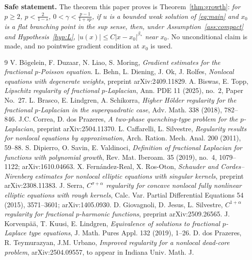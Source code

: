 \documentclass[11pt]{amsart}
\theoremstyle{plain}
\theoremstyle{definition}
\theoremstyle{remark}
\begin{document}
\medskip
\noindent\textbf{Safe statement.} The theorem this paper proves is
Theorem~\ref{thm:growth}: \emph{for $p\ge2$, $p<\frac2{1-s}$,
$0<\gamma<\frac{p-1}{1+sp}$, if $u$ is a bounded weak solution of
\eqref{eq:main} and $x_0$ is a flat branching point in the sup sense, then,
under Assumption~\ref{ass:compact} and Hypothesis~\ref{hyp:L},
$|u(x)|\le C|x-x_0|^{\beta_*}$ near $x_0$.} No unconditional claim is made,
and no pointwise gradient condition at $x_0$ is used.

\begin{thebibliography}{9}
 V. B\"ogelein, F. Duzaar, N. Liao, S. Moring, \emph{Gradient
estimates for the fractional $p$-Poisson equation}. %
 L. Behn, L. Diening, J. Ok, J. Rolfes, \emph{Nonlocal
equations with degenerate weights}, preprint arXiv:2409.11829.
 A. Biswas, E. Topp, \emph{Lipschitz regularity of fractional
$p$-Laplacian}, Ann. PDE 11 (2025), no.~2, Paper No.~27.
 L. Brasco, E. Lindgren, A. Schikorra, \emph{Higher H\"older
regularity for the fractional $p$-Laplacian in the superquadratic case},
Adv. Math. 338 (2018), 782--846.
 J.C. Correa, D. dos Prazeres, \emph{A two-phase quenching-type
problem for the $p$-Laplacian}, preprint arXiv:2504.11370.
 L. Caffarelli, L. Silvestre, \emph{Regularity results for
nonlocal equations by approximation}, Arch. Ration. Mech. Anal. 200 (2011),
59--88.
 S. Dipierro, O. Savin, E. Valdinoci, \emph{Definition of
fractional Laplacian for functions with polynomial growth}, Rev. Mat.
Iberoam. 35 (2019), no.~4, 1079--1122; arXiv:1610.04663.
 X. Fern\'andez-Real, X. Ros-Oton, \emph{Schauder and
Cordes--Nirenberg estimates for nonlocal elliptic equations with singular
kernels}, preprint arXiv:2308.11383.
 J. Serra, \emph{$C^{\sigma+\alpha}$ regularity for concave
nonlocal fully nonlinear elliptic equations with rough kernels}, Calc. Var.
Partial Differential Equations 54 (2015), 3571--3601; arXiv:1405.0930.
 D. Giovagnoli, D. Jesus, L. Silvestre, \emph{$C^{1+\alpha}$
regularity for fractional $p$-harmonic functions}, preprint arXiv:2509.26565.
 J. Korvenp\"a\"a, T. Kuusi, E. Lindgren, \emph{Equivalence of
solutions to fractional $p$-Laplace type equations}, J. Math. Pures Appl.
132 (2019), 1--26.
 D. dos Prazeres, R. Teymurazyan, J.M. Urbano, \emph{Improved
regularity for a nonlocal dead-core problem}, arXiv:2504.09557, to appear in
Indiana Univ. Math. J.
\end{thebibliography}
\end{document}
